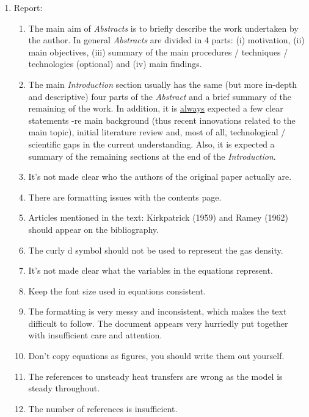 \documentclass[14pt,twoside]{report}
\begin{document}
\begin{enumerate}

\item Report:
\begin{enumerate}
%
\item The main aim of {\it Abstracts} is to briefly describe the work undertaken by the author. In general {\it Abstracts} are divided in 4 parts: (i) motivation, (ii) main objectives, (iii) summary of the main procedures / techniques / technologies (optional) and (iv) main findings. 
%
\item The main {\it Introduction} section usually has the same (but more in-depth and descriptive) four parts of the {\it Abstract} and a brief summary of the remaining of the work. In addition, it is \underline{always} expected a few clear statements -re main background (thus recent innovations related to the main topic), initial literature review and, most of all, technological / scientific gaps in the current understanding. Also, it is expected a summary of the remaining sections at the end of the {\it Introduction}.
%
\item It's not made clear who the authors of the original paper actually are.
%
\item There are formatting issues with the contents page.
%
\item Articles mentioned in the text: Kirkpatrick (1959) and Ramey (1962) should appear on the bibliography.
%
\item The curly d symbol should not be used to represent the gas density.
%
\item It's not made clear what the variables in the equations represent.
%
\item Keep the font size used in equations consistent.
%
\item The formatting is very messy and inconsistent, which makes the text difficult to follow. The document appears very hurriedly put together with insufficient care and attention.
%
\item Don't copy equations as figures, you should write them out yourself.
%
\item The references to unsteady heat transfers are wrong as the model is steady throughout.
%
\item The number of references is insufficient.
%

\end{enumerate}
\end{enumerate}
\end{document}
